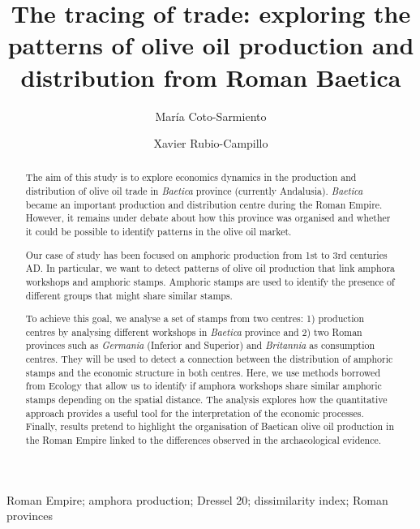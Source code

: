 \documentclass[review]{elsarticle}
\begin{document}
\begin{frontmatter}

\title{The tracing of trade: exploring the patterns of olive oil production and distribution from Roman Baetica}

\author[ceipacadress]{María Coto-Sarmiento}


\author[edadress,ubadress]{Xavier Rubio-Campillo}

\address[ceipacadress]{Department of Prehistory and Archaeology, Montalegre, 6-8, 08001, University of Barcelona, Barcelona, Spain}
\address[edadress]{School of History, Classic \& Archaeology, Room OOM.33, William Robertson Wing, Old Medical School, Teviot Place, University of Edinburgh, UK}
\address[ubadress]{DIDPATRI, Passeig de la Vall d'Hebrón, 171, Barcelona, Spain}

\begin{keyword}
Roman Empire; amphora production; Dressel 20; dissimilarity index; Roman provinces
\end{keyword}


\begin{abstract}

The aim of this study is to explore economics dynamics in the production and distribution of olive oil trade in \textit{Baetica} province (currently Andalusia). \textit{Baetica} became an important production and distribution centre during the Roman Empire. However, it remains under debate about how this province was organised and whether it could be possible to identify patterns in the olive oil market. 

Our case of study has been focused on amphoric production from 1st to 3rd centuries AD. In particular, we want to detect patterns of olive oil production that link amphora workshops and amphoric stamps. Amphoric stamps are used to identify the presence of different groups that might share similar stamps. 

To achieve this goal, we analyse a set of stamps from two centres: 1) production centres by analysing different workshops in \textit{Baetica} province and 2) two Roman provinces such as \textit{Germania} (Inferior and Superior) and \textit{Britannia} as consumption centres. They will be used to detect a connection between the distribution of amphoric stamps and the economic structure in both centres. Here, we use methods borrowed from Ecology that allow us to identify if amphora workshops share similar amphoric stamps depending on the spatial distance. The analysis explores how the quantitative approach provides a useful tool for the interpretation of the economic processes. Finally, results pretend to highlight the organisation of Baetican olive oil production in the Roman Empire linked to the differences observed in the archaeological evidence.



\end{abstract}
\end{frontmatter}
\end{document}
